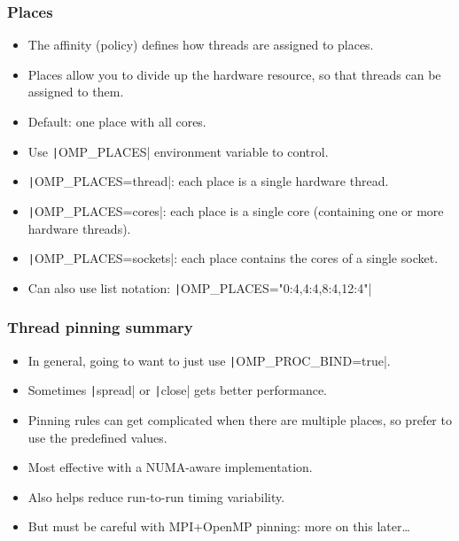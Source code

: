 \documentclass{beamer}
\begin{document}
\begin{frame}
\frametitle{Places}
\begin{itemize}
  \item The affinity (policy) defines how threads are assigned to places.
  \item Places allow you to divide up the hardware resource, so that threads can be assigned to them.
  \item Default: one place with all cores.
  \item Use \texttt|OMP_PLACES| environment variable to control.
  \item \texttt|OMP_PLACES=thread|: each place is a single hardware thread.
  \item \texttt|OMP_PLACES=cores|: each place is a single core (containing one or more hardware threads).
  \item \texttt|OMP_PLACES=sockets|: each place contains the cores of a single socket.
  \item Can also use list notation: \texttt|OMP_PLACES="{0:4},{4:4},{8:4},{12:4}"|
\end{itemize}
\end{frame}

\begin{frame}
\frametitle{Thread pinning summary}
\begin{itemize}
  \item In general, going to want to just use \texttt|OMP_PROC_BIND=true|.
  \item Sometimes \texttt|spread| or \texttt|close| gets better performance.
  \item Pinning rules can get complicated when there are multiple places, so prefer to use the predefined values.
  \item Most effective with a NUMA-aware implementation.
  \item Also helps reduce run-to-run timing variability.
  \item But must be careful with MPI+OpenMP pinning: more on this later\dots
\end{itemize}
\end{frame}

\end{document}
